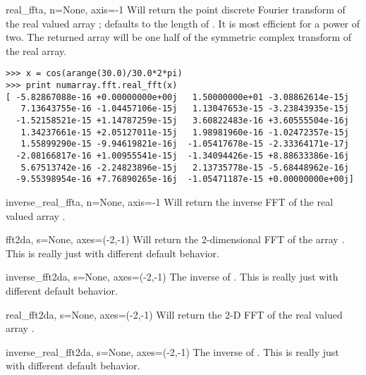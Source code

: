 \begin{funcdesc}{real_fft}{a, n=None, axis=-1}
   Will return the  point discrete Fourier transform of the 
   real valued array ;  defaults to the length of 
   .  It is most efficient for  a power of two.  
   The returned array will be one half of the symmetric complex transform of 
   the real array.

\begin{verbatim}
>>> x = cos(arange(30.0)/30.0*2*pi)
>>> print numarray.fft.real_fft(x)
[ -5.82867088e-16 +0.00000000e+00j   1.50000000e+01 -3.08862614e-15j
   7.13643755e-16 -1.04457106e-15j   1.13047653e-15 -3.23843935e-15j
  -1.52158521e-15 +1.14787259e-15j   3.60822483e-16 +3.60555504e-16j
   1.34237661e-15 +2.05127011e-15j   1.98981960e-16 -1.02472357e-15j
   1.55899290e-15 -9.94619821e-16j  -1.05417678e-15 -2.33364171e-17j
  -2.08166817e-16 +1.00955541e-15j  -1.34094426e-15 +8.88633386e-16j
   5.67513742e-16 -2.24823896e-15j   2.13735778e-15 -5.68448962e-16j
  -9.55398954e-16 +7.76890265e-16j  -1.05471187e-15 +0.00000000e+00j]
\end{verbatim}
\end{funcdesc}
       
\begin{funcdesc}{inverse_real_fft}{a, n=None, axis=-1}
   Will return the inverse FFT of the real valued array .
\end{funcdesc}
       
\begin{funcdesc}{fft2d}{a, s=None, axes=(-2,-1)}
   Will return the 2-dimensional FFT of the array .  This
   is really just  with different default behavior.
\end{funcdesc}
       
\begin{funcdesc}{inverse_fft2d}{a, s=None, axes=(-2,-1)}
  The inverse of . This is really just
   with different default behavior.
\end{funcdesc}
       
\begin{funcdesc}{real_fft2d}{a, s=None, axes=(-2,-1)}
   Will return the 2-D FFT of the real valued array .
\end{funcdesc}
            
\begin{funcdesc}{inverse_real_fft2d}{a, s=None, axes=(-2,-1)}
  The inverse of . This is really just
   with different default behavior.
\end{funcdesc}

